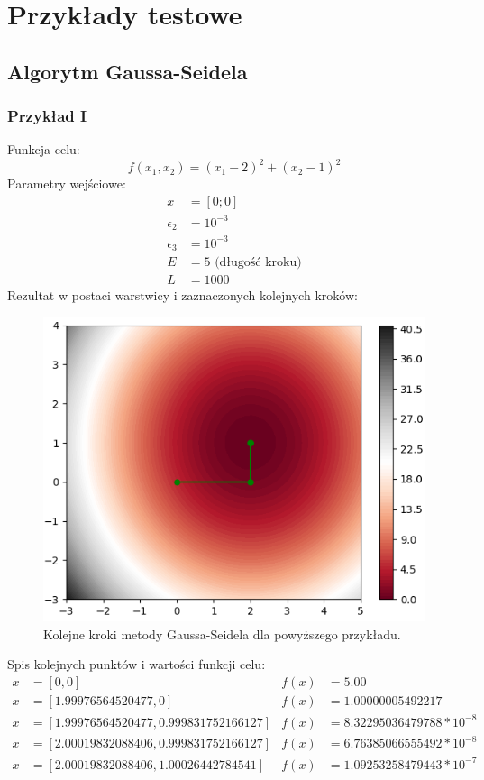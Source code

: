 \documentclass[a4paper,12pt]{article}
\begin{document}
\newpage
\section{Przykłady testowe}
\subsection{Algorytm Gaussa-Seidela}
\subsubsection{Przykład I}
Funkcja celu:
\begin{equation}
    f(x_{1}, x_{2}) = (x_{1} - 2)^{2} + (x_{2} - 1)^{2}
\end{equation}
Parametry wejściowe:
\begin{align*}
    x &= [0; 0] \\
    \epsilon_{2} &= 10^{-3} \\
    \epsilon_{3} &= 10^{-3} \\
    E &= 5 \mbox{ (długość kroku)}\\
    L &= 1000
\end{align*}
Rezultat w postaci warstwicy i zaznaczonych kolejnych kroków:
\begin{figure}[H]
    \centering
    \includegraphics[width=\textwidth]{images/gs_plot1.png}
    \caption{Kolejne kroki metody Gaussa-Seidela dla powyższego przykładu.}
    \label{uml_gauss_seidel}
\end{figure}
Spis kolejnych punktów i wartości funkcji celu:
\begin{align*}
x &= [0, 0] & f(x) &= 5.00 \\
x &= [1.99976564520477, 0] & f(x) &= 1.00000005492217 \\
x &= [1.99976564520477, 0.999831752166127] & f(x) &= 8.32295036479788 * 10^{-8} \\
x &= [2.00019832088406,0.999831752166127] & f(x) &= 6.76385066555492 * 10^{-8} \\
x &= [2.00019832088406,1.00026442784541] & f(x) &= 1.09253258479443 * 10^{-7}
\end{align*}
\end{document}
